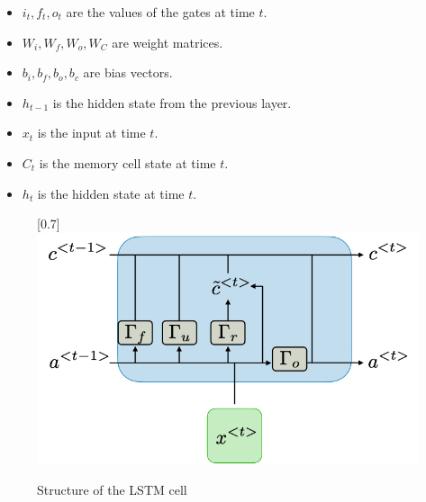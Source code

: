 \documentclass{ieeeojies}
\begin{document}
\begin{itemize}
\item $i_t, f_t, o_t$ are the values of the gates at time $t$.
\item $W_i, W_f, W_o, W_C$ are weight matrices.
\item $b_i, b_f, b_o, b_c$ are bias vectors.
\item $h_{t-1}$ is the hidden state from the previous layer.
\item $x_t$ is the input at time $t$.
\item $C_t$ is the memory cell state at time $t$.
\item $h_t$ is the hidden state at time $t$.
\end{itemize}
\begin{figure}[H]
    \centering
    \begin{minipage}{0.5\textwidth}
        \centering
        \scalebox{0.7}[0.7]{\includegraphics[width=\textwidth]{bibliography/Figure/LSTM.png}}
        \caption{Structure of the LSTM cell }
        \label{fig:3}
    \end{minipage}
\end{figure}
\end{document}

